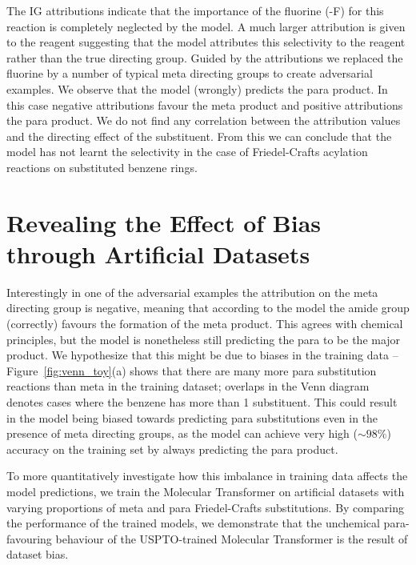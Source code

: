 The IG attributions indicate that the importance of the fluorine (-F) for this reaction is completely neglected by the model. A much larger attribution is given to the reagent suggesting that the model attributes this selectivity to the reagent rather than the true directing group. Guided by the attributions we replaced the fluorine by a number of typical meta directing groups to create adversarial examples. We observe that the model (wrongly) predicts the para product. In this case negative attributions favour the meta product and positive attributions the para product. We do not find any correlation between the attribution values and the directing effect of the substituent. From this we can conclude that the model has not learnt the selectivity in the case of Friedel-Crafts acylation reactions on substituted benzene rings. 

\section{Revealing the Effect of Bias through Artificial Datasets}
Interestingly in one of the adversarial examples the attribution on the meta directing group is negative, meaning that according to the model the amide group (correctly) favours the formation of the meta product. This agrees with chemical principles, but the model is nonetheless still predicting the para to be the major product. We hypothesize that this might be due to biases in the training data -- Figure~\ref{fig:venn_toy}(a) shows that there are many more para substitution reactions than meta in the training dataset; overlaps in the Venn diagram denotes cases where the benzene has more than 1 substituent. This could result in the model being biased towards predicting para substitutions even in the presence of meta directing groups, as the model can achieve very high ($\sim 98\%$) accuracy on the training set by always predicting the para product.

To more quantitatively investigate how this imbalance in training data affects the model predictions, we train the Molecular Transformer on artificial datasets with varying proportions of meta and para Friedel-Crafts substitutions. By comparing the performance of the trained models, we demonstrate that the unchemical para-favouring behaviour of the USPTO-trained Molecular Transformer is the result of dataset bias.


